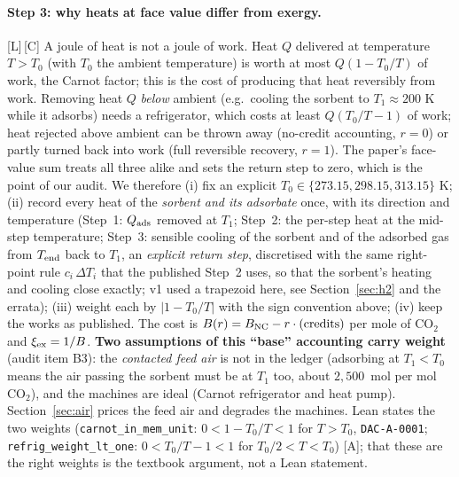 \documentclass[10pt]{article}
\newcommand{\tier}[1]{\textsf{[#1]}}
\newcommand{\tA}{\tier{A}}
\newcommand{\tL}{\tier{L}}
\newcommand{\tC}{\tier{C}}
\newcommand{\lean}[1]{\texttt{#1}}
\newcommand{\id}[1]{\texttt{DAC-#1}}
\begin{document}
\paragraph{Step 3: why heats at face value differ from exergy.}\tL{}\,\tC{} A joule of heat is not a joule of work. Heat $Q$ delivered at temperature $T>T_0$ (with $T_0$ the ambient temperature) is worth at most
$Q(1-T_0/T)$ of work, the Carnot factor; this is the cost of producing that heat reversibly from work. Removing heat $Q$ \emph{below} ambient (e.g.\ cooling the sorbent to $T_1\approx200$ K while it adsorbs) needs a refrigerator, which costs at least $Q(T_0/T-1)$ of work;
heat rejected above ambient can be thrown away (no-credit accounting, $r=0$) or partly turned back into work (full reversible recovery, $r=1$). The paper's face-value sum treats all three alike
and sets the return step to zero, which is the point of our audit. We therefore (i) fix an explicit $T_0\in\{273.15,298.15,313.15\}$ K; (ii) record every heat of the \emph{sorbent and its adsorbate} once, with its direction and temperature (Step~1: $Q_{\rm ads}$ removed at $T_1$; Step~2: the per-step
heat at the mid-step temperature; Step~3: sensible cooling of the sorbent and of the adsorbed gas from $T_{\rm end}$ back to $T_1$, an \emph{explicit return step}, discretised with the same right-point rule $c_i\,\Delta T_i$ that the published Step~2 uses, so that the sorbent's heating and cooling close exactly; v1 used a trapezoid here, see Section~\ref{sec:h2} and the errata); (iii) weight each by $\lvert1-T_0/T\rvert$ with the sign convention above; (iv) keep the works as published. The cost is
$B(r)=B_{\rm NC}-r\cdot({\rm credits})$ per mole of CO$_2$ and $\xi_{\rm ex}=1/B$. \textbf{Two assumptions of this ``base'' accounting carry weight} (audit item B3): the \emph{contacted feed air} is not in the ledger (adsorbing at $T_1<T_0$ means the air passing the sorbent must be at $T_1$ too, about $2{,}500$~mol per mol CO$_2$), and the machines are ideal (Carnot refrigerator and heat pump). Section~\ref{sec:air} prices the feed air and degrades the machines. Lean states the two weights (\lean{carnot\_in\_mem\_unit}: $0<1-T_0/T<1$ for $T>T_0$, \id{A-0001}; \lean{refrig\_weight\_lt\_one}: $0<T_0/T-1<1$ for $T_0/2<T<T_0$) \tA; that these are the right weights is the textbook argument, not a Lean statement.
\end{document}
